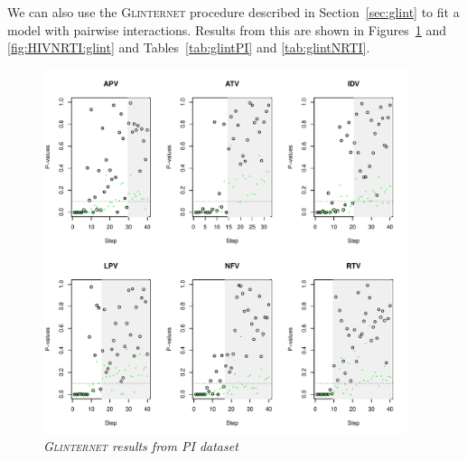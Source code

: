 \documentclass{imsart}
\begin{document}
We can also use the \textsc{Glinternet} procedure described in Section~\ref{sec:glint} to fit a model with pairwise interactions. Results from this are shown in Figures~\ref{fig:HIVPI:glint} and \ref{fig:HIVNRTI:glint} and Tables~\ref{tab:glintPI} and \ref{tab:glintNRTI}.

\begin{figure}[!htp]
\begin{center}
\includegraphics[width=0.95\textwidth]{../figs/HIV_PI_glint.pdf}
\caption{\small \it \textsc{Glinternet} results from PI dataset}
\label{fig:HIVPI:glint}
\end{center}
\end{figure}
\end{document}
